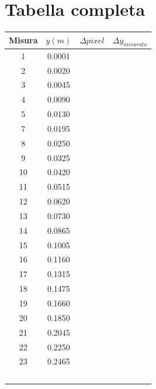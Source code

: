 \documentclass[12pt, a4paper]{article}
\begin{document}
\newpage

\section{Tabella completa}
\begin{table}[h!]
    \centering
    {\renewcommand\arraystretch{1.0} 
    \begin{tabular}{|c|c|c|c|}
    \hline
         \footnotesize Misura & $y$$(m)$ &$\Delta pixel$& $\Delta y_{misurato}$ \\
    \hline
         \footnotesize 1 &\footnotesize 0.0001& & \\
         \footnotesize 2 & \footnotesize0.0020& & \\
         \footnotesize 3 & \footnotesize0.0045& & \\
         \footnotesize 4 & \footnotesize0.0090& & \\
         \footnotesize 5 & \footnotesize0.0130& & \\
         \footnotesize 7 &\footnotesize0.0195 & & \\
         \footnotesize 8 &\footnotesize0.0250 & & \\
         \footnotesize 9 & \footnotesize0.0325& & \\
         \footnotesize 10 &\footnotesize0.0420 & & \\
         \footnotesize 11 & \footnotesize0.0515& & \\
         \footnotesize 12 & \footnotesize0.0620& & \\ 
         \footnotesize 13 &\footnotesize 0.0730& & \\
         \footnotesize 14 & \footnotesize0.0865& & \\
         \footnotesize 15 & \footnotesize0.1005& & \\
         \footnotesize 16 & \footnotesize0.1160& & \\
         \footnotesize 17 & \footnotesize0.1315& & \\
         \footnotesize 18 & \footnotesize0.1475& & \\
         \footnotesize 19 & \footnotesize0.1660& & \\
         \footnotesize 20 & \footnotesize0.1850& & \\
         \footnotesize 21 & \footnotesize0.2045& & \\
         \footnotesize 22 &\footnotesize 0.2250& & \\
         \footnotesize 23 & \footnotesize0.2465& & \\
$$
\end{tabular}}
\end{table}
\end{document}
